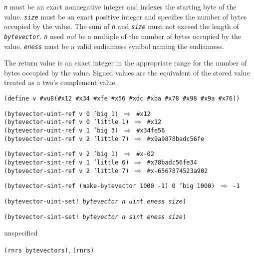 \texttt{\textit{n}} must be an exact nonnegative integer and
indexes the starting byte of the value.
\texttt{\textit{size}} must be an exact positive integer and specifies the number
of bytes occupied by the value.
The sum of \texttt{\textit{n}} and \texttt{\textit{size}} must not exceed the length
of \texttt{\textit{bytevector}}.
\texttt{\textit{n}} need \textit{not} be a multiple of the
number of bytes occupied by the value.
\texttt{\textit{eness}} must be a valid endianness symbol naming the endianness.

The return value is an exact integer in the appropriate range for
the number of bytes occupied by the value.
Signed values are the equivalent of the stored value treated as a two's
complement value.


\begin{alltt}
(define v \#{}vu8(\#{}x12 \#{}x34 \#{}xfe \#{}x56 \#{}xdc \#{}xba \#{}x78 \#{}x98 \#{}x9a \#{}x76))

(bytevector-uint-ref v 0 'big 1) \(\Rightarrow\) \#{}x12
(bytevector-uint-ref v 0 'little 1) \(\Rightarrow\) \#{}x12
(bytevector-uint-ref v 1 'big 3) \(\Rightarrow\) \#{}x34fe56
(bytevector-uint-ref v 2 'little 7) \(\Rightarrow\) \#{}x9a9878badc56fe

(bytevector-sint-ref v 2 'big 1) \(\Rightarrow\) \#{}x-02
(bytevector-sint-ref v 1 'little 6) \(\Rightarrow\) \#{}x78badc56fe34
(bytevector-sint-ref v 2 'little 7) \(\Rightarrow\) \#{}x-6567874523a902

(bytevector-sint-ref (make-bytevector 1000 -1) 0 'big 1000) \(\Rightarrow\) -1
\end{alltt}

\begin{description}

\label{objects_s259}\item[procedure] \texttt{(bytevector-uint-set! \textit{bytevector} \textit{n} \textit{uint} \textit{eness} \textit{size})}



\item[procedure] \texttt{(bytevector-sint-set! \textit{bytevector} \textit{n} \textit{sint} \textit{eness} \textit{size})}



\item[returns] unspecified


\item[libraries] \texttt{(rnrs bytevectors)}, \texttt{(rnrs)}
\end{description}


